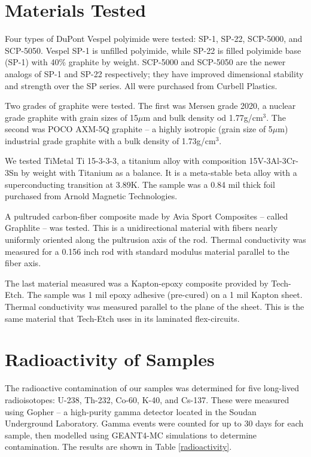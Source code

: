\documentclass[final]{svjour2}
\begin{document}
\section{Materials Tested}
Four types of DuPont Vespel polyimide were tested: SP-1, SP-22, SCP-5000, and SCP-5050.  Vespel SP-1 is unfilled polyimide, while SP-22 is filled polyimide base (SP-1) with 40\% graphite by weight. SCP-5000 and SCP-5050 are the newer analogs of SP-1 and SP-22 respectively; they have improved dimensional stability and strength over the SP series. All were purchased from Curbell Plastics.

Two grades of graphite were tested. The first was Mersen grade 2020, a nuclear grade graphite with grain sizes of 15$\mu$m and bulk density od 1.77g/cm$^3$. The second was POCO AXM-5Q graphite -- a highly isotropic (grain size of 5$\mu$m) industrial grade graphite with a bulk density of 1.73g/cm$^3$.

We tested TiMetal Ti 15-3-3-3, a titanium alloy with composition 15V-3Al-3Cr-3Sn by weight with Titanium as a balance. It is a meta-stable beta alloy with a superconducting transition at 3.89K. The sample was a 0.84 mil thick foil purchased from Arnold Magnetic Technologies.

A pultruded carbon-fiber composite made by Avia Sport Composites -- called Graphlite -- was tested. This is a unidirectional material with fibers nearly uniformly oriented along the pultrusion axis of the rod. Thermal conductivity was measured for a 0.156 inch rod with standard modulus material parallel to the fiber axis.

The last material measured was a Kapton-epoxy composite provided by Tech-Etch. The sample was 1 mil epoxy adhesive (pre-cured) on a 1 mil Kapton sheet. Thermal conductivity was measured parallel to the plane of the sheet. This is the same material that Tech-Etch uses in its laminated flex-circuits.

\section{Radioactivity of Samples}
The radioactive contamination of our samples was determined for five long-lived radioisotopes: U-238, Th-232, Co-60, K-40, and Cs-137. These were measured using Gopher -- a high-purity gamma detector located in the Soudan Underground Laboratory. Gamma events were counted for up to 30 days for each sample, then modelled using GEANT4-MC simulations to determine contamination. The results are shown in Table \ref{radioactivity}.
\end{document}
